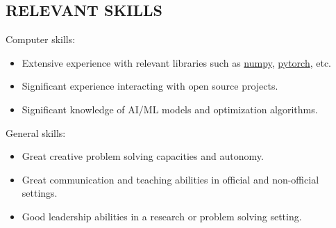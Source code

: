 \documentclass[margin, 10pt]{res} %
\begin{document}
\begin{resume}
\section{RELEVANT SKILLS}
Computer skills:
\vspace*{0.15cm}
\begin{itemize}
	\item Extensive experience with relevant libraries such as \href{https://numpy.org/doc/stable/index.html}{numpy}, \href{https://pytorch.org/}{pytorch}, etc.
	\item Significant experience interacting with open source projects. %
	\item Significant knowledge of AI/ML models and optimization algorithms.
\end{itemize}
\vspace{-0.10cm}
General skills:
\vspace*{0.15cm}
\begin{itemize}
	\item Great creative problem solving capacities and autonomy.
	\item Great communication and teaching abilities in official and non-official settings.
	\item Good leadership abilities in a research or problem solving setting.
\end{itemize} 





\end{resume}
\end{document}
